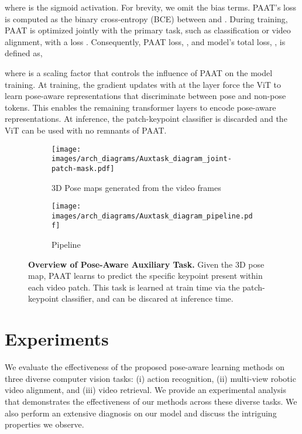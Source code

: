 \documentclass{article}
\begin{document}
where  is the sigmoid activation. For brevity, we omit the bias terms. PAAT's loss is computed as the binary cross-entropy (BCE) between  and . During training, PAAT is optimized jointly with the primary task, such as classification or video alignment, with a loss . Consequently, PAAT loss, , and model's total loss, , is defined as,
\vspace{-0.05in}

\vspace{-0.05in}
where  is a scaling factor that controls the influence of PAAT on the model training. At training, the gradient updates with  at the  layer force the ViT to learn pose-aware representations that discriminate between pose and non-pose tokens. This enables the remaining transformer layers to encode pose-aware representations. At inference, the patch-keypoint classifier is discarded and the ViT can be used with no remnants of PAAT.


\begin{figure*}
    \begin{subfigure}{0.45\textwidth}
        \texttt{[image: images/arch\_diagrams/Auxtask\_diagram\_joint-patch-mask.pdf]}
        \caption{3D Pose maps generated from the video frames}
        \label{fig:paat_inputs_and_attentions}
    \end{subfigure}
    \hfill
    \begin{subfigure}{0.50\textwidth}
        \texttt{[image: images/arch\_diagrams/Auxtask\_diagram\_pipeline.pdf]}
        \caption{Pipeline}
        \label{fig:paat_variants}
    \end{subfigure}
    \caption{\textbf{Overview of Pose-Aware Auxiliary Task.} Given the 3D pose map, PAAT learns to predict the specific keypoint present within each video patch. This task is learned at train time via the patch-keypoint classifier, and can be discared at inference time.} \vspace{-0.15in}
\end{figure*}
\section{Experiments}
We evaluate the effectiveness of the proposed pose-aware learning methods on three diverse computer vision tasks: (i) action recognition, (ii) multi-view robotic video alignment, and (iii) video retrieval. We provide an experimental analysis that demonstrates the effectiveness of our methods across these diverse tasks. We also perform an extensive diagnosis on our model and discuss the intriguing properties we observe.
 
\end{document}

